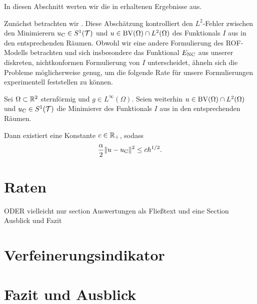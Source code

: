 In diesen Abschnitt werten wir die in  erhaltenen
Ergebnisse aus.


Zunächst betrachten wir \cite[S. 309, Theorem 10.7]{Bar15}. Diese
Abschätzung kontrolliert den
$L^2$-Fehler zwischen den Minimierern $u_{\textup{C}}\in S^1(\mathcal{T})$ und
$u\in\textup{BV}(\Omega)\cap L^2(\Omega)$ des Funktionals $I$ aus  in
den entsprechenden Räumen. Obwohl wir eine andere Formulierung des ROF-Modells 
betrachten und sich insbesondere das Funktional $E_\textup{NC}$ aus unserer diskreten,
nichtkonformen Formulierung von $I$ unterscheidet, ähneln sich die 
Probleme möglicherweise genug, um die folgende Rate für unsere Formulierungen
experimentell feststellen zu können.

\begin{theorem}
  \label{thm:errorEstimateCourant}
  Sei $\Omega\subset\mathbb{R}^2$ sternförmig und $g\in L^\infty(\Omega)$.  Seien
  weiterhin $u\in\textup{BV}(\Omega)\cap L^2(\Omega)$ und $u_{\textup{C}}\in S^1(\mathcal{T})$ die
  Minimierer des Funktionals $I$ aus  in den entsprechenden
  Räumen.

  Dann existiert eine Konstante $c\in\mathbb{R}_+$, sodass
  \begin{align*}
    \frac{\alpha}{2}\Vert u-u_{\textup{C}}\Vert^2\leq
    ch^{1/2}.
  \end{align*}
\end{theorem}

\bigskip

\section{Raten}
ODER vielleicht nur section Auswertungen als Fließtext und eine Section
Ausblick und Fazit
\section{Verfeinerungsindikator}
\section{Fazit und Ausblick}
